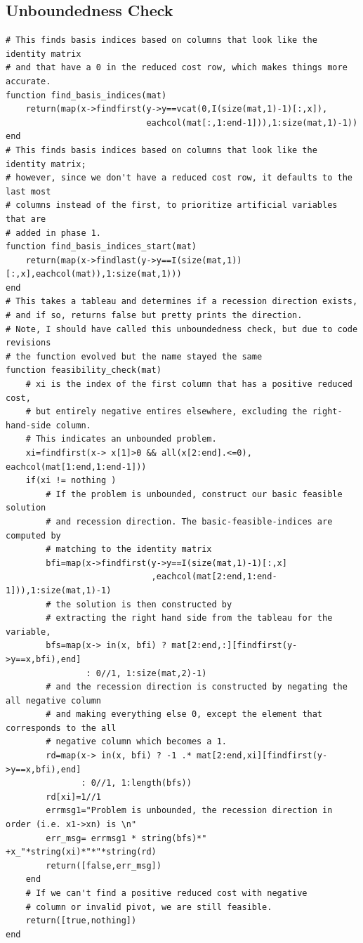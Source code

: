 \documentclass[11pt]{article}
\begin{document}
\subsection{Unboundedness Check}
\label{sec:orgde0c83d}
\begin{verbatim}
# This finds basis indices based on columns that look like the identity matrix
# and that have a 0 in the reduced cost row, which makes things more accurate.
function find_basis_indices(mat)
    return(map(x->findfirst(y->y==vcat(0,I(size(mat,1)-1)[:,x]),
                            eachcol(mat[:,1:end-1])),1:size(mat,1)-1))
end
# This finds basis indices based on columns that look like the identity matrix;
# however, since we don't have a reduced cost row, it defaults to the last most
# columns instead of the first, to prioritize artificial variables that are
# added in phase 1.
function find_basis_indices_start(mat)
    return(map(x->findlast(y->y==I(size(mat,1))[:,x],eachcol(mat)),1:size(mat,1)))
end
# This takes a tableau and determines if a recession direction exists,
# and if so, returns false but pretty prints the direction.
# Note, I should have called this unboundedness check, but due to code revisions
# the function evolved but the name stayed the same
function feasibility_check(mat)
    # xi is the index of the first column that has a positive reduced cost,
    # but entirely negative entires elsewhere, excluding the right-hand-side column.
    # This indicates an unbounded problem.
    xi=findfirst(x-> x[1]>0 && all(x[2:end].<=0), eachcol(mat[1:end,1:end-1]))
    if(xi != nothing )
        # If the problem is unbounded, construct our basic feasible solution
        # and recession direction. The basic-feasible-indices are computed by
        # matching to the identity matrix
        bfi=map(x->findfirst(y->y==I(size(mat,1)-1)[:,x]
                             ,eachcol(mat[2:end,1:end-1])),1:size(mat,1)-1)
        # the solution is then constructed by
        # extracting the right hand side from the tableau for the variable,
        bfs=map(x-> in(x, bfi) ? mat[2:end,:][findfirst(y->y==x,bfi),end]
                : 0//1, 1:size(mat,2)-1)
        # and the recession direction is constructed by negating the all negative column
        # and making everything else 0, except the element that corresponds to the all
        # negative column which becomes a 1.
        rd=map(x-> in(x, bfi) ? -1 .* mat[2:end,xi][findfirst(y->y==x,bfi),end]
               : 0//1, 1:length(bfs))
        rd[xi]=1//1
        errmsg1="Problem is unbounded, the recession direction in order (i.e. x1->xn) is \n"
        err_msg= errmsg1 * string(bfs)*" +x_"*string(xi)*"*"*string(rd)
        return([false,err_msg])
    end
    # If we can't find a positive reduced cost with negative
    # column or invalid pivot, we are still feasible.
    return([true,nothing])
end
\end{verbatim}
\end{document}
